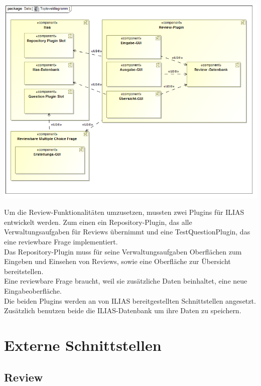 \documentclass[a4paper]{scrreprt}
\begin{document}
\includegraphics[width=1.0\textwidth]{Component_Diagram__Topleveldiagramm.png}
\label{Toplevel-Architektur}

Um die Review-Funktionalitäten umzusetzen, mussten zwei Plugins für ILIAS entwickelt werden. 
Zum einen ein Repository-Plugin, das alle Verwaltungsaufgaben für Reviews übernimmt und eine TestQuestionPlugin, das eine reviewbare Frage implementiert.\\

Das Repository-Plugin muss für seine Verwaltungsaufgaben Oberflächen zum Eingeben und Einsehen von Reviews, sowie eine Oberfläche zur Übersicht bereitstellen.\\

Eine reviewbare Frage braucht, weil sie zusätzliche Daten beinhaltet, eine neue Eingabeoberfläche. \\

Die beiden Plugins werden an von ILIAS bereitgestellten Schnittstellen angesetzt. 
Zusätzlich benutzen beide die ILIAS-Datenbank um ihre Daten zu speichern.\\

\section{Externe Schnittstellen}

\newpage
\subsection{Review}
\end{document}
